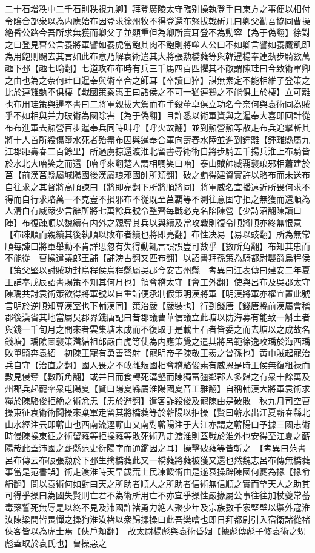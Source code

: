 二十石增秩中二千石則秩視九卿】拜登廣陵太守臨别操執登手曰東方之事便以相付令隂合部衆以為内應始布因登求徐州牧不得登還布怒拔戟斫几曰卿父勸吾協同曹操絶昏公路今吾所求無獲而卿父子並顯重但為卿所賣耳登不為動容【為于偽翻】徐對之曰登見曹公言養將軍譬如養虎當飽其肉不飽則將噬人公曰不如卿言譬如養鷹飢即為用飽則颺去其言如此布意乃解袁術遣其大將張勲橋蕤等與韓暹楊奉連埶步騎數萬趣下邳【趣七喻翻】七道攻布布時有兵三千馬四百匹懼其不敵謂陳珪曰今致術軍卿之由也為之奈何珪曰暹奉與術卒合之師耳【卒讀曰猝】謀無素定不能相維子登策之比於連雞埶不俱棲【戰國策秦惠王曰諸侯之不可一猶連鷄之不能俱上於棲】立可離也布用珪策與暹奉書曰二將軍親拔大駕而布手殺董卓俱立功名今奈何與袁術同為賊乎不如相與并力破術為國除害【為于偽翻】且許悉以術軍資與之暹奉大喜即回計從布布進軍去勲營百步暹奉兵同時叫呼【呼火故翻】並到勲營勲等散走布兵追擊斬其將十人首所殺傷墮水死者殆盡布因與暹奉合軍向壽春水陸並進到鍾離【鍾離縣屬九江郡距壽春二百餘里】所過虜掠還渡淮北留書辱術術自將步騎五千揚兵淮上布騎皆於水北大咍笑之而還【咍呼來翻楚人謂相啁笑曰咍】泰山賊帥臧覇襲琅邪相蕭建於莒【前漢莒縣屬城陽國後漢屬琅邪國帥所類翻】破之覇得建資實許以賂布而未送布自往求之其督將高順諫曰【將即亮翻下所將順將同】將軍威名宣播遠近所畏何求不得而自行求賂萬一不克豈不損邪布不從既至莒覇等不測往意固守拒之無獲而還順為人清白有威嚴少言辭所將七萬餘兵號令整齊每戰必克名陷陳營【少詩沼翻陳讀曰陣】布復疎順以魏續有内外之親奪其兵以與續及當攻戰則復令順將順亦終無恨意【布踈順而親續其後執順以敗布者續也將即亮翻】布性决易【易以豉翻】所為無常順每諫曰將軍舉動不肯詳思忽有失得動輒言誤誤豈可數乎【數所角翻】布知其忠而不能從　曹操遣議郎王誧【誧滂古翻又匹布翻】以詔書拜孫策為騎都尉襲爵烏程侯【策父堅以討賊功封烏程侯烏程縣屬吳郡今安吉州縣　考異曰江表傳曰建安二年夏王誧奉戊辰詔書賜策不知其何月也】領會稽太守【會工外翻】使與呂布及吳郡太守陳瑀共討袁術策欲得將軍號以自重誧便承制假策明漢將軍【明漢將軍亦權宜置此號言明於逆順知尊漢室也下輔漢同】策治嚴【嚴裝也】行到錢唐【錢唐縣前漢屬會稽郡後漢省其地當屬吳郡界錢唐記曰昔郡議曹華信議立此塘以防海募有能致一斛土者與錢一千旬月之間來者雲集塘未成而不復取于是載土石者皆委之而去塘以之成故名錢塘】瑀隂圖襲策濳結祖郎嚴白虎等使為内應策覺之遣其將呂範徐逸攻瑀於海西瑀敗單騎奔袁紹　初陳王寵有勇善弩射【寵明帝子陳敬王羨之曾孫也】黄巾賊起寵治兵自守【治直之翻】國人畏之不敢離叛國相會稽駱俊素有威恩是時王侯無復租禄而數見侵奪【數所角翻】或并日而食轉死溝壑而陳獨富彊鄰郡人多歸之有衆十餘萬及州郡兵起寵率衆屯陽夏【賢曰陽夏縣屬淮陽國夏音工雅翻】自稱輔漢大將軍袁術求糧於陳駱俊拒絶之術忿恚【恚於避翻】遣客詐殺俊及寵陳由是破敗　秋九月司空曹操東征袁術術聞操來棄軍走留其將橋蕤等於蘄陽以拒操【賢曰蘄水出江夏蘄春縣北山水經注云即蘄山也西南流逕蘄山又南對蘄陽注于大江亦謂之蘄陽口予據三國志術時侵陳操東征之術留蕤等拒操蕤等敗死術乃走渡淮則蓋戰於淮外也安得至江夏之蘄陽哉此蓋沛國之蘄縣范史衍陽字而通鑑因之耳】操擊破蕤等皆斬之　【考異曰范書呂布傳云布破張勲於下邳生擒橋蕤此又一橋蕤將蕤被獲又還也然魏志呂布傳無橋蕤事當是范書誤】術走渡淮時天旱歲荒士民凍餒術由是遂衰操辟陳國何夔為掾【掾俞絹翻】問以袁術何如對曰天之所助者順人之所助者信術無信順之實而望天人之助其可得乎操曰為國失賢則亡君不為術所用亡不亦宜乎操性嚴掾屬公事往往加杖夔常蓄毒藥誓死無辱是以終不見及沛國許褚勇力絶人聚少年及宗族數千家堅壁以禦外寇淮汝陳梁間皆畏憚之操狥淮汝褚以衆歸操操曰此吾樊噲也即日拜都尉引入宿衛諸從禇俠客皆以為虎士焉【俠戶頰翻】　故太尉楊彪與袁術昏姻【據彪傳彪子修袁術之甥彪蓋取於袁氏也】曹操惡之
